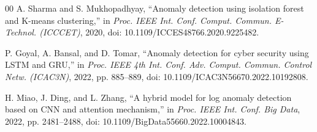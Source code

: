 \documentclass[10pt,conference]{IEEEtran}
\begin{document}
\begin{thebibliography}{00}
 A. Sharma and S. Mukhopadhyay, ``Anomaly detection using isolation forest and K-means clustering,'' in \emph{Proc. IEEE Int. Conf. Comput. Commun. E-Technol. (ICCCET)}, 2020, doi: 10.1109/ICCES48766.2020.9225482.

 P. Goyal, A. Bansal, and D. Tomar, ``Anomaly detection for cyber security using LSTM and GRU,'' in \emph{Proc. IEEE 4th Int. Conf. Adv. Comput. Commun. Control Netw. (ICAC3N)}, 2022, pp. 885--889, doi: 10.1109/ICAC3N56670.2022.10192808.

 H. Miao, J. Ding, and L. Zhang, ``A hybrid model for log anomaly detection based on CNN and attention mechanism,'' in \emph{Proc. IEEE Int. Conf. Big Data}, 2022, pp. 2481--2488, doi: 10.1109/BigData55660.2022.10004843.

\end{thebibliography}
\end{document}
